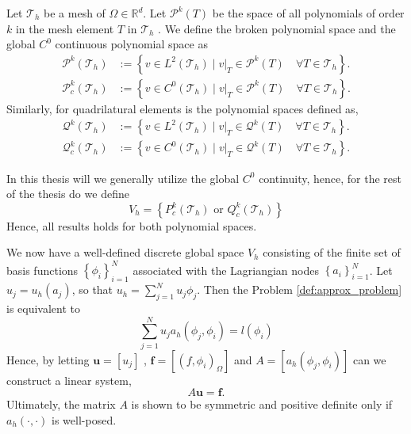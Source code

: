\begin{definition}
    Let $\mathcal{T}_{h} $ be a mesh of $\Omega \in \mathbb{R} ^{d} $. Let $\mathcal{P}^{k}(T) $ be the space of all polynomials of order $k$ in the mesh element $T$ in $\mathcal{T}_{h}$ . We define the broken polynomial space and the global $C^{0}$ continuous polynomial space as
    \begin{equation}
        \begin{split}
    \mathcal{P}^{k} ( \mathcal{T}_{h} ) & := \left\{ v \in L^{2}( \mathcal{T}_{h} )    \mid  v|_{T} \in \mathcal{P}^k( T) \quad  \forall T \in  \mathcal{T}_{h}   \right\}. \\
    \mathcal{P}^{k}_{c} ( \mathcal{T}_{h} ) & := \left\{ v \in C^{0}( \mathcal{T}_{h}  )   \mid  v|_{T} \in \mathcal{P}^k( T) \quad  \forall T \in  \mathcal{T}_{h}   \right\}.
        \end{split}
    \end{equation}
    Similarly, for quadrilatural elements is the polynomial spaces defined as,
    \begin{equation}
        \begin{split}
    \mathcal{Q}^{k} ( \mathcal{T}_{h} ) & := \left\{ v \in L^{2}( \mathcal{T}_{h} )    \mid  v|_{T} \in \mathcal{Q}^k( T) \quad  \forall T \in  \mathcal{T}_{h}   \right\}. \\
    \mathcal{Q}^{k}_{c} ( \mathcal{T}_{h} ) & := \left\{ v \in C^{0}( \mathcal{T}_{h} )   \mid  v|_{T} \in \mathcal{Q}^k( T) \quad  \forall T \in  \mathcal{T}_{h}   \right\}.
        \end{split}
    \end{equation}

\end{definition}

In this thesis will we generally utilize the global $C^{0}$ continuity, hence, for the rest of the thesis do we define
\begin{equation}
    \label{def:Vh_background}
V_{h} =  \left\{ P_{c}^{k}( \mathcal{T}_{h} ) \text{ or }  Q_{c}^{k}( \mathcal{T}_{h} )
 \right\} \end{equation}
Hence, all results holds for both polynomial spaces.

We now have a well-defined discrete global space  $V_{h} $ consisting of the finite set of basis functions $\left\{ \phi _{i} \right\}_{i=1}^{N} $ associated with the Lagriangian nodes $\left\{ a_{i} \right\}_{i=1}^{N}  $. Let $u_{j} = u_{h}\left(
a_{j} \right) $, so that $u_{h} = \sum_{j=1}^{N} u_{j} \phi _{j}  $. Then the Problem \ref{def:approx_problem} is equivalent to
 \[
\sum_{j = 1}^{N} u_{j} a_{h}\left( \phi _{j}, \phi _{i} \right)  = l\left( \phi _{i} \right)
\]
Hence, by letting $\mathbf{u} = \left[ u_{j} \right] $ , $\mathbf{f} = \left[ \left( f, \phi _{i}  \right) _{\Omega } \right] $  and $A = \left[ a_{h}\left( \phi _{j}, \phi _{i} \right)  \right] $ can we construct a linear system,
\begin{equation}
\label{eq:linear_system}
    A \mathbf{u} =\mathbf{f}.
\end{equation}
Ultimately, the matrix $A$ is shown to be symmetric and positive definite only if $a_{h}( \cdot ,\cdot ) $ is well-posed.

